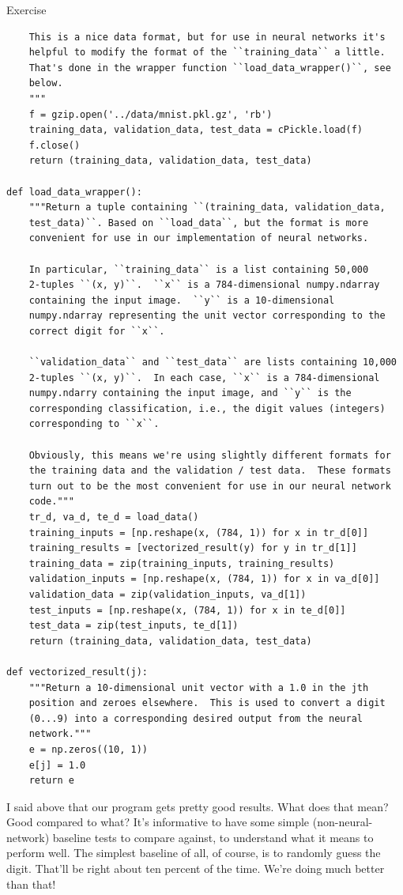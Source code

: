 \begin{exerciseBox}{Exercise}
\begin{lstlisting}
    This is a nice data format, but for use in neural networks it's
    helpful to modify the format of the ``training_data`` a little.
    That's done in the wrapper function ``load_data_wrapper()``, see
    below.
    """
    f = gzip.open('../data/mnist.pkl.gz', 'rb')
    training_data, validation_data, test_data = cPickle.load(f)
    f.close()
    return (training_data, validation_data, test_data)

def load_data_wrapper():
    """Return a tuple containing ``(training_data, validation_data,
    test_data)``. Based on ``load_data``, but the format is more
    convenient for use in our implementation of neural networks.

    In particular, ``training_data`` is a list containing 50,000
    2-tuples ``(x, y)``.  ``x`` is a 784-dimensional numpy.ndarray
    containing the input image.  ``y`` is a 10-dimensional
    numpy.ndarray representing the unit vector corresponding to the
    correct digit for ``x``.

    ``validation_data`` and ``test_data`` are lists containing 10,000
    2-tuples ``(x, y)``.  In each case, ``x`` is a 784-dimensional
    numpy.ndarry containing the input image, and ``y`` is the
    corresponding classification, i.e., the digit values (integers)
    corresponding to ``x``.

    Obviously, this means we're using slightly different formats for
    the training data and the validation / test data.  These formats
    turn out to be the most convenient for use in our neural network
    code."""
    tr_d, va_d, te_d = load_data()
    training_inputs = [np.reshape(x, (784, 1)) for x in tr_d[0]]
    training_results = [vectorized_result(y) for y in tr_d[1]]
    training_data = zip(training_inputs, training_results)
    validation_inputs = [np.reshape(x, (784, 1)) for x in va_d[0]]
    validation_data = zip(validation_inputs, va_d[1])
    test_inputs = [np.reshape(x, (784, 1)) for x in te_d[0]]
    test_data = zip(test_inputs, te_d[1])
    return (training_data, validation_data, test_data)

def vectorized_result(j):
    """Return a 10-dimensional unit vector with a 1.0 in the jth
    position and zeroes elsewhere.  This is used to convert a digit
    (0...9) into a corresponding desired output from the neural
    network."""
    e = np.zeros((10, 1))
    e[j] = 1.0
    return e

\end{lstlisting}


I said above that our program gets pretty good results. What does that mean? Good compared to what? It's informative to have some simple (non-neural-network) baseline tests to compare against, to understand what it means to perform well. The simplest baseline of all, of course, is to randomly guess the digit. That'll be right about ten percent of the time. We're doing much better than that!



\end{exerciseBox}
